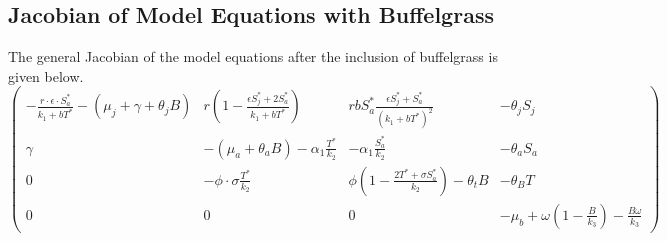 \documentclass[a4paper]{article}
\begin{document}
\subsection{Jacobian of Model Equations with Buffelgrass}
The general Jacobian of the model equations after the inclusion of buffelgrass is given below.
\begin{equation}\label{eq:JacobianBuffel}
\begin{pmatrix}
-\displaystyle\frac{r\cdot\epsilon \cdot S_a^*}{k_1+bT^*}-(\mu_j+\gamma+\theta_j B) & r\left(1-\displaystyle\frac{\epsilon S_j^*+2S_a^*}{k_1+bT^*}\right) & r b S_a^*\displaystyle\frac{\epsilon S_j^*+S_a^*}{(k_1+bT^*)^2} & -\theta_j S_j\\
\gamma & -(\mu_a+\theta_a B) - \alpha_1 \displaystyle\frac{T^*}{k_2} & -\alpha_1\displaystyle\frac{S_a^*}{k_2} & -\theta_a S_a\\
0 & -\phi\cdot\sigma\displaystyle\frac{T^*}{k_2} & \phi\left(1-\displaystyle\frac{2T^*+\sigma S_a^*}{k_2}\right) - \theta_t B & -\theta_B T\\
0 & 0 & 0 &  -\mu_b +\omega \left(1 - \displaystyle\frac{B}{k_3}\right) - \displaystyle\frac{B \omega}{k_3} 
\end{pmatrix}
\end{equation}


\end{document}
